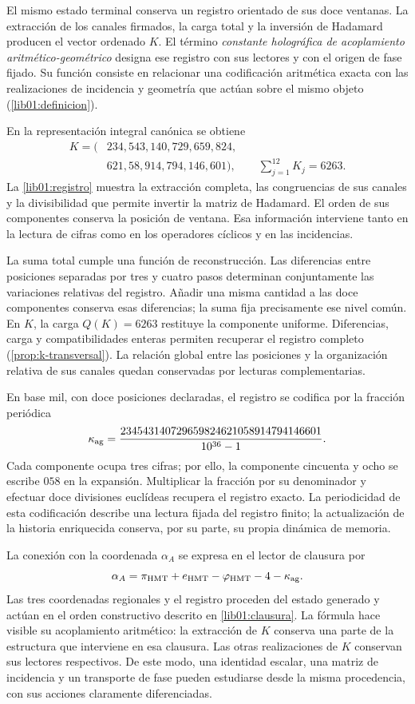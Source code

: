 El mismo estado terminal conserva un registro orientado de sus doce
ventanas. La extracción de los canales firmados, la carga total y la
inversión de Hadamard producen el vector ordenado \(K\). El término
\emph{constante holográfica de acoplamiento aritmético-geométrico}
designa ese registro con sus lectores y con el origen de fase fijado.
Su función consiste en relacionar una codificación aritmética exacta
con las realizaciones de incidencia y geometría que actúan sobre el
mismo objeto (\cref{lib01:definicion}).

En la representación integral canónica se obtiene
\[
 \begin{aligned}
 K=\bigl(&234,543,140,729,659,824,\\
         &621,58,914,794,146,601\bigr),
 \qquad\sum_{j=1}^{12}K_j=6263.
 \end{aligned}
\]
La \cref{lib01:registro} muestra la extracción completa, las
congruencias de sus canales y la divisibilidad que permite invertir
la matriz de Hadamard. El orden de sus componentes conserva la
posición de ventana. Esa información interviene tanto en la lectura
de cifras como en los operadores cíclicos y en las incidencias.

La suma total cumple una función de reconstrucción. Las diferencias
entre posiciones separadas por tres y cuatro pasos determinan
conjuntamente las variaciones relativas del registro. Añadir una misma
cantidad a las doce componentes conserva esas diferencias; la suma fija
precisamente ese nivel común. En \(K\), la carga \(Q(K)=6263\)
restituye la componente uniforme. Diferencias, carga y compatibilidades
enteras permiten recuperar el registro completo
(\cref{prop:k-transversal}). La relación global entre las posiciones y
la organización relativa de sus canales quedan conservadas por lecturas
complementarias.

En base mil, con doce posiciones declaradas, el registro se codifica
por la fracción periódica
\[
 \kappa_{\rm ag}=
 \frac{234543140729659824621058914794146601}{10^{36}-1}.
\]
Cada componente ocupa tres cifras; por ello, la componente cincuenta
y ocho se escribe \(058\) en la expansión. Multiplicar la fracción
por su denominador y efectuar doce divisiones euclídeas recupera el
registro exacto. La periodicidad de esta codificación describe una
lectura fijada del registro finito; la actualización de la historia
enriquecida conserva, por su parte, su propia dinámica de memoria.

La conexión con la coordenada \(\alpha_A\) se expresa en el lector
de clausura por
\[
 \alpha_A=
 \pi_{\rm HMT}+e_{\rm HMT}-\varphi_{\rm HMT}-4-\kappa_{\rm ag}.
\]
Las tres coordenadas regionales y el registro proceden del estado
generado y actúan en el orden constructivo descrito en
\cref{lib01:clausura}. La fórmula hace visible su acoplamiento
aritmético: la extracción de \(K\) conserva una parte de la
estructura que interviene en esa clausura. Las otras realizaciones
de \(K\) conservan sus lectores respectivos. De este modo, una
identidad escalar, una matriz de incidencia y un transporte de fase
pueden estudiarse desde la misma procedencia, con sus acciones
claramente diferenciadas.

